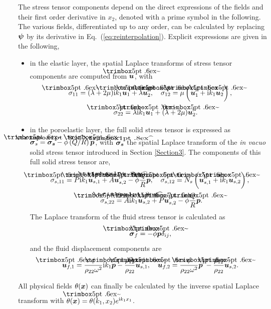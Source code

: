 The stress tensor components depend on the direct expressions of the fields and their first order derivative in $x_2$, denoted with a prime symbol in the following. The various fields, differentiated up to any order, can be calculated by replacing $\boldsymbol \psi$ by its derivative in Eq.~(\ref{eq:reinterpolation}). Explicit expressions are given in the following, 
\begin{itemize}
    \item in the elastic layer, the spatial Laplace transforms of stress tensor components are computed from $\tilde{\mbf u}$, with
    \begin{equation}
    \begin{aligned}
       \tilde \sigma_{11} = (\lambda + 2\mu) &\im k_1 \tilde {\mbf u}_1 + \lambda \tilde {\mbf u}_2^\prime , \quad \tilde {\sigma}_{12} = \mu \left( \tilde {\mbf u}^\prime_1 + \im k_1 \tilde {\mbf u}_2\right), \\ &\tilde {\sigma}_{22} = \lambda \im k_1 \tilde {\mbf u}_1 + (\lambda + 2\mu) \tilde {\mbf u}_2^\prime.
    \end{aligned}
    \end{equation}
    \item in the poroelastic layer, the full solid stress tensor is expressed as $\tilde{\mbf  \sigma}_s = \mbf{\hat \sigma_s} - \phi \left( Q/R \right) \tilde{\mbf p}$, with $\mbf{\hat \sigma_s}$ the spatial Laplace transform of the \emph{in vacuo} solid stress tensor introduced in Section \ref{Section3}. The components of this full solid stress tensor are, 
    \begin{equation}
    \begin{aligned}
    \tilde {\sigma}_{s, 11} =  P \im k_1 \tilde {\mbf u}_{s,1} &+ \hat A \tilde {\mbf u}_{s,2}^{\prime} -  \phi \frac{Q}{R} \tilde {\mbf p}, \quad \tilde {\sigma}_{s, 12} = N_s \left( \tilde {\mbf u}_{s,1}^{ \prime} + \im k_1 \tilde {\mbf u}_{s,2} \right), \\ &\tilde {\sigma}_{s, 22} = \hat A \im k_1 \tilde {\mbf u}_{s,2} + P \tilde {\mbf u}_{s,2}^{ \prime} - \phi \frac{Q}{R} \tilde {\mbf p}.
    \end{aligned}
    \end{equation}
    The Laplace transform of the fluid stress tensor is calculated as 
    \begin{equation}
        \tilde {\mbf \sigma}_f = - \phi \tilde {\mbf p} \delta_{i j},
    \end{equation}
    and the fluid displacement components are 
    \begin{equation}
        \tilde {\mbf u}_{f, 1} = \frac{\phi}{\rho_{22}\omega^2} \im k_1 \tilde {\mbf p} - \frac{\rho_{12}}{\rho_{22}} \tilde {\mbf u}_{s, 1}, \quad
        \tilde {\mbf u}_{f, 2} = \frac{\phi}{\rho_{22}\omega^2} 
        \tilde {\mbf p}^{\prime} - \frac{\rho_{12}}{\rho_{22}} \tilde {\mbf u}_{s, 2}.
    \end{equation}
\end{itemize}
All physical fields $\theta(\boldsymbol x)$ can finally be calculated by the inverse spatial Laplace transform with $\theta(\mbf x)=\tilde \theta(k_1,x_2)e^{\im k_1 x_1} $. 
 
